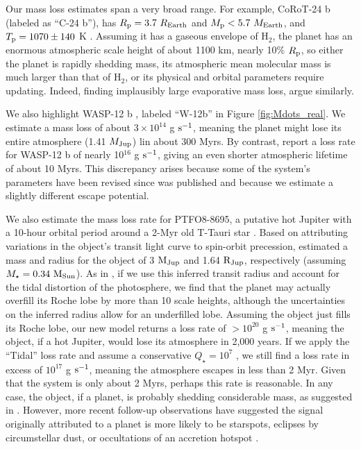 \documentclass{aastex}
\begin{document}
Our mass loss estimates span a very broad range. For example, CoRoT-24 b (labeled as ``C-24 b''), has $R_{\rm p} = 3.7\ R_{\rm Earth}$ and $M_{\rm p} < 5.7\ M_{\rm Earth}$, and $T_{\rm p} = 1070 \pm 140$ K \citep{2014A&A...567A.112A}. Assuming it has a gaseous envelope of H$_2$, the planet has an enormous atmospheric scale height of about 1100 km, nearly 10\% $R_{\rm p}$, so either the planet is rapidly shedding mass, its atmospheric mean molecular mass is much larger than that of H$_2$, or its physical and orbital parameters require updating. Indeed, finding implausibly large evaporative mass loss, \citet{2016arXiv160503595L} argue similarly.

We also highlight WASP-12 b \citep{2009ApJ...693.1920H}, labeled ``W-12b'' in Figure \ref{fig:Mdots_real}. We estimate a mass loss of about $3\times10^{14}$ g ${\rm s^{-1}}$, meaning the planet might lose its entire atmosphere (1.41 $M_{\rm Jup}$) lin about 300 Myrs. By contrast, \citet{2010Natur.463.1054L} report a loss rate for WASP-12 b of nearly 10$^{16}$ g ${\rm s^{-1}}$, giving an even shorter atmospheric lifetime of about 10 Myrs. This discrepancy arises because some of the system's parameters have been revised since \citet{2010Natur.463.1054L} was published and because we estimate a slightly different escape potential. 

We also estimate the mass loss rate for PTFO8-8695, a putative hot Jupiter with a 10-hour orbital period around a 2-Myr old T-Tauri star \citep{2012ApJ...755...42V}. Based on attributing variations in the object's transit light curve to spin-orbit precession, \citet{2013ApJ...774...53B} estimated a mass and radius for the object of 3 ${\rm M_{Jup}}$ and 1.64 ${\rm R_{Jup}}$, respectively (assuming $M_\star = 0.34\ {\rm M_{{\rm Sun}}}$). As in \citet{2010Natur.463.1054L}, if we use this inferred transit radius and account for the tidal distortion of the photosphere, we find that the planet may actually overfill its Roche lobe by more than 10 scale heights, although the uncertainties on the inferred radius allow for an underfilled lobe. Assuming the object just fills its Roche lobe, our new model returns a loss rate of $> 10^{20}$ g ${\rm s^{-1}}$, meaning the object, if a hot Jupiter, would lose its atmosphere in 2,000 years. If we apply the ``Tidal'' loss rate and assume a conservative $Q_\star = 10^7$ \citep{2016arXiv160600848P}, we still find a loss rate in excess of $10^{17}$ g ${\rm s^{-1}}$, meaning the atmosphere escapes in less than 2 Myr. Given that the system is only about 2 Myrs, perhaps this rate is reasonable. In any case, the object, if a planet, is probably shedding considerable mass, as suggested in \citet{2016arXiv160602701J}. However, more recent follow-up observations have suggested the signal originally attributed to a planet is more likely to be starspots, eclipses by circumstellar dust, or occultations of an accretion hotspot \citep{2015ApJ...812...48Y}.
\end{document}
